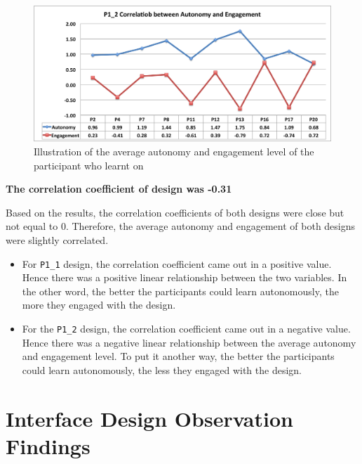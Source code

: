\begin{figure}[H]
\centering
\includegraphics[width=1 \textwidth]{r14}
\caption{Illustration of the average autonomy and engagement level of the participant who learnt on  }
\end{figure}
\begin{addmargin}[6.5em]{3em}
\textbf{The correlation coefficient of  design was -0.31}
\end{addmargin}
\newpage 
Based on the results, the correlation coefficients of both designs were close but not equal to 0. Therefore, the average autonomy and engagement of both designs were slightly correlated.
\begin{itemize} 

\item For \verb|P1_1| design, the correlation coefficient came out in a positive value. Hence there was a positive linear relationship between the two variables. In the other word, the better the participants could learn autonomously, the more they engaged with the design. 


\item For the \verb|P1_2| design, the correlation coefficient came out in a negative value. Hence there was a negative linear relationship between the average autonomy and engagement level. To put it another way, the better the participants could learn autonomously, the less they engaged with the design. 

\end{itemize}





\section{Interface Design Observation Findings} 


